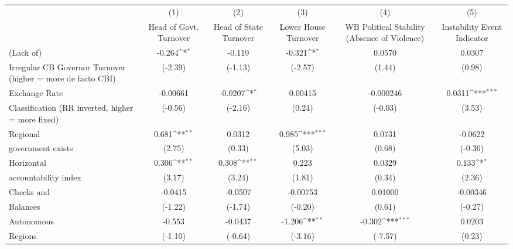{
\def\sym#1{\ifmmode^{#1}\else\(^{#1}\)\fi}
\begin{tabular}{l*{5}{c}}
\toprule
                &\multicolumn{1}{c}{(1)}&\multicolumn{1}{c}{(2)}&\multicolumn{1}{c}{(3)}&\multicolumn{1}{c}{(4)}&\multicolumn{1}{c}{(5)}\\
                &\multicolumn{1}{c}{Head of Govt. Turnover}&\multicolumn{1}{c}{Head of State Turnover}&\multicolumn{1}{c}{Lower House Turnover}&\multicolumn{1}{c}{WB Political Stability (Absence of Violence)}&\multicolumn{1}{c}{Instability Event Indicator}\\
\midrule
(Lack of)       &   -0.264\sym{*}  &   -0.119         &   -0.321\sym{*}  &   0.0570         &   0.0307         \\
Irregular CB Governor Turnover (higher = more de facto CBI)&  (-2.39)         &  (-1.13)         &  (-2.57)         &   (1.44)         &   (0.98)         \\
\addlinespace
Exchange Rate   & -0.00661         &  -0.0207\sym{*}  &  0.00415         &-0.000246         &   0.0311\sym{***}\\
Classification (RR inverted, higher = more fixed)&  (-0.56)         &  (-2.16)         &   (0.24)         &  (-0.03)         &   (3.53)         \\
\addlinespace
Regional        &    0.681\sym{**} &   0.0312         &    0.985\sym{***}&   0.0731         &  -0.0622         \\
government exists   &   (2.75)         &   (0.33)         &   (5.03)         &   (0.68)         &  (-0.36)         \\
\addlinespace
Horizontal      &    0.306\sym{**} &    0.308\sym{**} &    0.223         &   0.0329         &    0.133\sym{*}  \\
accountability index&   (3.17)         &   (3.24)         &   (1.81)         &   (0.34)         &   (2.36)         \\
\addlinespace
Checks and      &  -0.0415         &  -0.0507         & -0.00753         &  0.01000         & -0.00346         \\
Balances        &  (-1.22)         &  (-1.74)         &  (-0.20)         &   (0.61)         &  (-0.27)         \\
\addlinespace
Autonomous      &   -0.553         &  -0.0437         &   -1.206\sym{**} &   -0.302\sym{***}&   0.0203         \\
Regions         &  (-1.10)         &  (-0.64)         &  (-3.16)         &  (-7.57)         &   (0.23)         \\

\end{tabular}}
